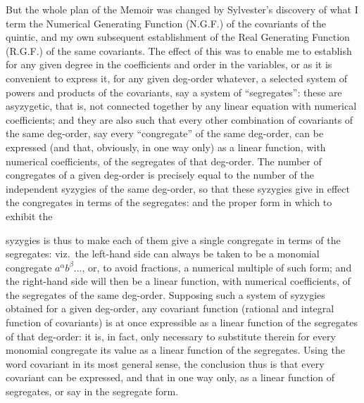 \documentclass[11pt]{article}
\begin{document}
But the whole plan of the Memoir was changed by Sylvester's discovery of what I term the Numerical Generating Function (N.G.F.) of the covariants of the quintic, and my own subsequent establishment of the Real Generating Function (R.G.F.) of the same covariants. The effect of this was to enable me to establish for any given degree in the coefficients and order in the variables, or as it is convenient to express it, for any given deg-order whatever, a selected system of powers and products of the covariants, say a system of ``segregates'': these are asyzygetic, that is, not connected together by any linear equation with numerical coefficients; and they are also such that every other combination of covariants of the same deg-order, say every ``congregate'' of the same deg-order, can be expressed (and that, obviously, in one way only) as a linear function, with numerical coefficients, of the segregates of that deg-order. The number of congregates of a given deg-order is precisely equal to the number of the independent syzygies of the same deg-order, so that these syzygies give in effect the congregates in terms of the segregates: and the proper form in which to exhibit the


\noindent syzygies is thus to make each of them give a single congregate in terms of the segregates: viz.\ the left-hand side can always be taken to be a monomial congregate $a^{\alpha}b^{\beta}\ldots$, or, to avoid fractions, a numerical multiple of such form; and the right-hand side will then be a linear function, with numerical coefficients, of the segregates of the same deg-order. Supposing such a system of syzygies obtained for a given deg-order, any covariant function (rational and integral function of covariants) is at once expressible as a linear function of the segregates of that deg-order: it is, in fact, only necessary to substitute therein for every monomial congregate its value as a linear function of the segregates. Using the word covariant in its most general sense, the conclusion thus is that every covariant can be expressed, and that in one way only, as a linear function of segregates, or say in the segregate form.
\end{document}
